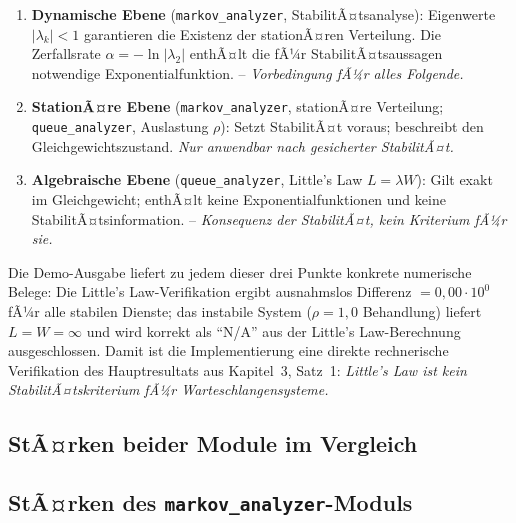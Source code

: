 ﻿\documentclass[a4paper,12pt]{report}
\theoremstyle{definition}
\begin{document}
\begin{enumerate}
	\item[-] \textbf{Dynamische Ebene} (\texttt{markov\_analyzer},
	StabilitÃ¤tsanalyse): Eigenwerte $|\lambda_k| < 1$ garantieren
	die Existenz der stationÃ¤ren Verteilung. Die Zerfallsrate
	$\alpha = -\ln|\lambda_2|$ enthÃ¤lt die fÃ¼r StabilitÃ¤tsaussagen
	notwendige Exponentialfunktion. -- \emph{Vorbedingung fÃ¼r alles Folgende.}
	
	\item[-] \textbf{StationÃ¤re Ebene} (\texttt{markov\_analyzer},
	stationÃ¤re Verteilung; \texttt{queue\_analyzer}, Auslastung $\rho$):
	Setzt StabilitÃ¤t voraus; beschreibt den Gleichgewichtszustand.
	\emph{Nur anwendbar nach gesicherter StabilitÃ¤t.}
	
	\item[-] \textbf{Algebraische Ebene} (\texttt{queue\_analyzer},
	Little's Law $L = \lambda W$): Gilt exakt im Gleichgewicht;
	enthÃ¤lt keine Exponentialfunktionen und keine StabilitÃ¤tsinformation.
	-- \emph{Konsequenz der StabilitÃ¤t, kein Kriterium fÃ¼r sie.}
\end{enumerate}

Die Demo-Ausgabe liefert zu jedem dieser drei Punkte konkrete numerische
Belege: Die Little's Law-Verifikation ergibt ausnahmslos Differenz
$= 0{,}00 \cdot 10^0$ fÃ¼r alle stabilen Dienste; das instabile System
($\rho = 1{,}0$ Behandlung) liefert $L = W = \infty$ und wird korrekt
als ``N/A'' aus der Little's Law-Berechnung ausgeschlossen.
Damit ist die Implementierung eine direkte rechnerische Verifikation
des Hauptresultats aus Kapitel~3, Satz~1: \emph{Little's Law
	ist kein StabilitÃ¤tskriterium fÃ¼r Warteschlangensysteme.}

\subsection{StÃ¤rken beider Module im Vergleich}
\label{sec:module-staerken}

\subsection{StÃ¤rken des \texttt{markov\_analyzer}-Moduls}
\end{document}
